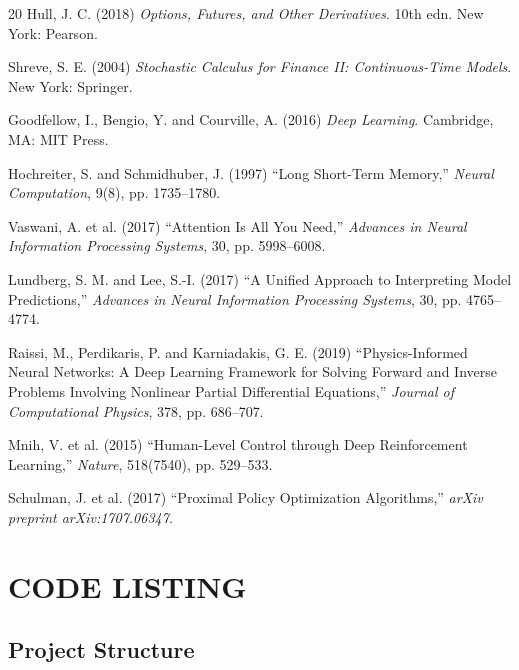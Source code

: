 \documentclass[12pt,a4paper]{report}
\begin{document}
\begin{thebibliography}{20}
Hull, J. C. (2018) \textit{Options, Futures, and Other Derivatives}. 10th edn. New York: Pearson.

Shreve, S. E. (2004) \textit{Stochastic Calculus for Finance II: Continuous-Time Models}. New York: Springer.

Goodfellow, I., Bengio, Y. and Courville, A. (2016) \textit{Deep Learning}. Cambridge, MA: MIT Press.

Hochreiter, S. and Schmidhuber, J. (1997) ``Long Short-Term Memory,'' \textit{Neural Computation}, 9(8), pp. 1735--1780.

Vaswani, A. et al. (2017) ``Attention Is All You Need,'' \textit{Advances in Neural Information Processing Systems}, 30, pp. 5998--6008.

Lundberg, S. M. and Lee, S.-I. (2017) ``A Unified Approach to Interpreting Model Predictions,'' \textit{Advances in Neural Information Processing Systems}, 30, pp. 4765--4774.

Raissi, M., Perdikaris, P. and Karniadakis, G. E. (2019) ``Physics-Informed Neural Networks: A Deep Learning Framework for Solving Forward and Inverse Problems Involving Nonlinear Partial Differential Equations,'' \textit{Journal of Computational Physics}, 378, pp. 686--707.

Mnih, V. et al. (2015) ``Human-Level Control through Deep Reinforcement Learning,'' \textit{Nature}, 518(7540), pp. 529--533.

Schulman, J. et al. (2017) ``Proximal Policy Optimization Algorithms,'' \textit{arXiv preprint arXiv:1707.06347}.

\end{thebibliography}



\appendix

\chapter{CODE LISTING}

\section{Project Structure}
\end{document}
